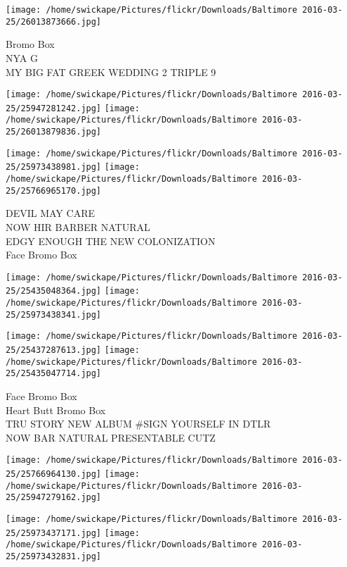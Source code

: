 \documentclass[10pt,letterpaper]{article}
\begin{document}
\vspace{0.25in}
\texttt{[image: /home/swickape/Pictures/flickr/Downloads/Baltimore 2016-03-25/26013873666.jpg]}

Bromo Box\\
NYA G\\
MY BIG FAT GREEK WEDDING 2 TRIPLE 9\\
\pagebreak

\texttt{[image: /home/swickape/Pictures/flickr/Downloads/Baltimore 2016-03-25/25947281242.jpg]}
\texttt{[image: /home/swickape/Pictures/flickr/Downloads/Baltimore 2016-03-25/26013879836.jpg]}

\texttt{[image: /home/swickape/Pictures/flickr/Downloads/Baltimore 2016-03-25/25973438981.jpg]}
\texttt{[image: /home/swickape/Pictures/flickr/Downloads/Baltimore 2016-03-25/25766965170.jpg]}

DEVIL MAY CARE\\
NOW HIR BARBER NATURAL\\
EDGY ENOUGH THE NEW COLONIZATION\\
Face Bromo Box\\
\pagebreak

\texttt{[image: /home/swickape/Pictures/flickr/Downloads/Baltimore 2016-03-25/25435048364.jpg]}
\texttt{[image: /home/swickape/Pictures/flickr/Downloads/Baltimore 2016-03-25/25973438341.jpg]}

\texttt{[image: /home/swickape/Pictures/flickr/Downloads/Baltimore 2016-03-25/25437287613.jpg]}
\texttt{[image: /home/swickape/Pictures/flickr/Downloads/Baltimore 2016-03-25/25435047714.jpg]}

Face Bromo Box\\
Heart Butt Bromo Box\\
TRU STORY NEW ALBUM \#SIGN YOURSELF IN DTLR\\
NOW BAR NATURAL PRESENTABLE CUTZ\\
\pagebreak

\texttt{[image: /home/swickape/Pictures/flickr/Downloads/Baltimore 2016-03-25/25766964130.jpg]}
\texttt{[image: /home/swickape/Pictures/flickr/Downloads/Baltimore 2016-03-25/25947279162.jpg]}

\texttt{[image: /home/swickape/Pictures/flickr/Downloads/Baltimore 2016-03-25/25973437171.jpg]}
\texttt{[image: /home/swickape/Pictures/flickr/Downloads/Baltimore 2016-03-25/25973432831.jpg]}
\end{document}
